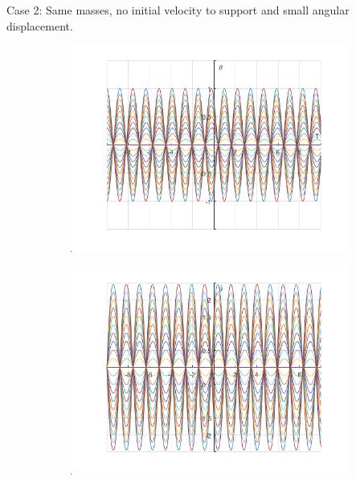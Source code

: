 \documentclass{article}
\begin{document}
\newpage
	Case 2:
	Same masses, no initial velocity to support and small angular displacement.	
		\graphicspath{{./SmallOscillations/S2} }
		\begin{figure}[h!]
		\centering
		\begin{subfigure}[b]{0.48\linewidth}
			\includegraphics[width=\linewidth]{./SmallOscillations/S2/F1.png}
		\end{subfigure}
		\begin{subfigure}[b]{0.48\linewidth}
			\includegraphics[width=\linewidth]{./SmallOscillations/S2/F2.png}
		\end{subfigure}
	\end{figure}
\end{document}
